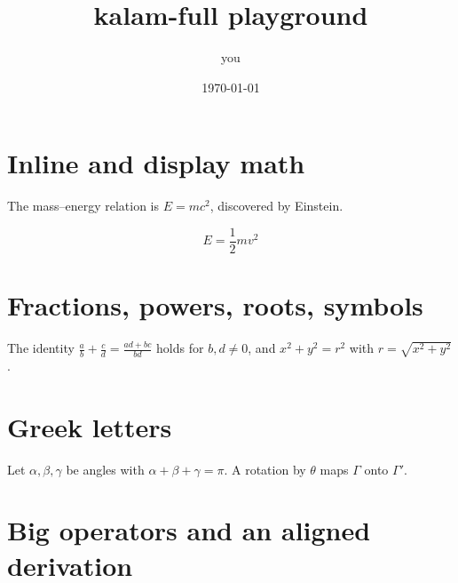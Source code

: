 \documentclass{article}
\title{kalam-full playground}
\author{you}
\date{\today}
\begin{document}
\maketitle


\section{Inline and display math}

The mass–energy relation is $E = mc^2$, discovered by Einstein.

\[
    E = \frac{1}{2} m v^2
\]

\section{Fractions, powers, roots, symbols}

The identity $\frac{a}{b} + \frac{c}{d} = \frac{ad + bc}{bd}$ holds for
$b, d \neq 0$, and $x^2 + y^2 = r^2$ with $r = \sqrt{x^2 + y^2}$.

\section{Greek letters}

Let $\alpha, \beta, \gamma$ be angles with $\alpha + \beta + \gamma =
\pi$. A rotation by $\theta$ maps $\Gamma$ onto $\Gamma'$.

\section{Big operators and an aligned derivation}
\end{document}
